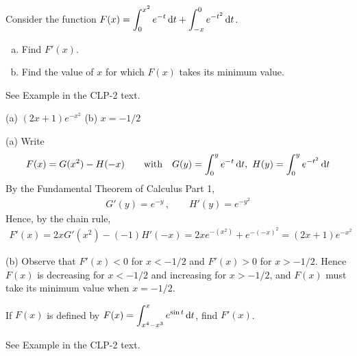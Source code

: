 \begin{question}[2016Q2]
Consider the function $\displaystyle F(x)=\int_0^{x^2} e^{-t}\,\mathrm{d}t +\int_{-x}^0 e^{-t^2}\,\mathrm{d}t$.
\begin{enumerate}[(a)]
\item
Find $F'(x)$.
\item
Find the value of $x$ for which $F(x)$ takes its minimum value.
\end{enumerate}
\end{question}

\begin{hint}
See Example  in the
CLP-2 text.
\end{hint}

\begin{answer}
(a) $(2x+1)e^{-x^2}$
\qquad (b) $x=-1/2$
\end{answer}

\begin{solution}
(a) Write
\begin{align*}
F(x)=G(x^2)-H(-x)\qquad\hbox{with}\quad G(y)=\int_0^{y} e^{-t}\,\mathrm{d}t,\
H(y)=\int^{y}_0 e^{-t^2}\,\mathrm{d}t
\end{align*}
By the Fundamental Theorem of Calculus Part 1,
\begin{align*}
G'(y)=e^{-y}\, ,\qquad
H'(y)= e^{-y^2}
\end{align*}
Hence, by the chain rule,
\begin{align*}
F'(x)=2x G'(x^2)-(-1)H'(-x)=2x e^{-(x^2)}+e^{-(-x)^2}
      =(2x+1)e^{-x^2}
\end{align*}

\noindent (b) Observe that $F'(x)<0$ for $x<-1/2$ and $F'(x)>0$ for $x>-1/2$.
Hence $F(x)$ is decreasing for $x<-1/2$ and increasing for $x>-1/2$,
and $F(x)$ must take its minimum value when $x=-1/2$.

\end{solution}

\begin{question}[2016A]
If $F(x)$ is defined by
$\displaystyle F(x) = \int_{x^4-x^3}^x e^{\sin t}\,\mathrm{d}t$, find $F'(x)$.
\end{question}

\begin{hint}
See Example  in the
CLP-2 text.

\end{hint}

